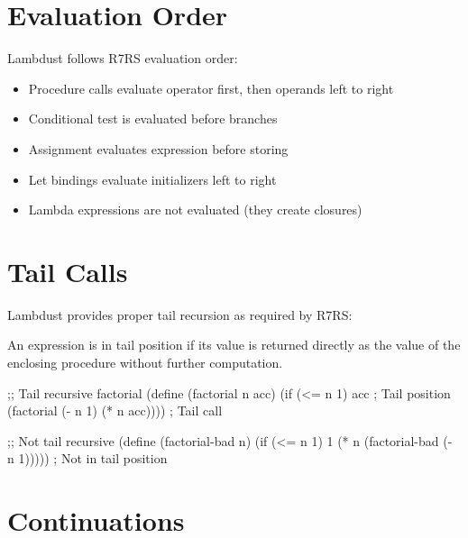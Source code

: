 \section{Evaluation Order}
\label{sec:evaluation}


Lambdust follows R7RS evaluation order:

\begin{itemize}
\item Procedure calls evaluate operator first, then operands left to right
\item Conditional test is evaluated before branches
\item Assignment evaluates expression before storing
\item Let bindings evaluate initializers left to right
\item Lambda expressions are not evaluated (they create closures)
\end{itemize}

\section{Tail Calls}
\label{sec:tail-calls}


Lambdust provides proper tail recursion as required by R7RS:

\begin{definition}
An expression is in tail position if its value is returned directly as the value of the enclosing procedure without further computation.
\end{definition}

\begin{example}
\begin{lambdustcode}
;; Tail recursive factorial
(define (factorial n acc)
  (if (<= n 1) 
      acc                           ; Tail position
      (factorial (- n 1) (* n acc)))) ; Tail call

;; Not tail recursive  
(define (factorial-bad n)
  (if (<= n 1)
      1
      (* n (factorial-bad (- n 1))))) ; Not in tail position
\end{lambdustcode}
\end{example}

\section{Continuations}
\label{sec:continuations}


